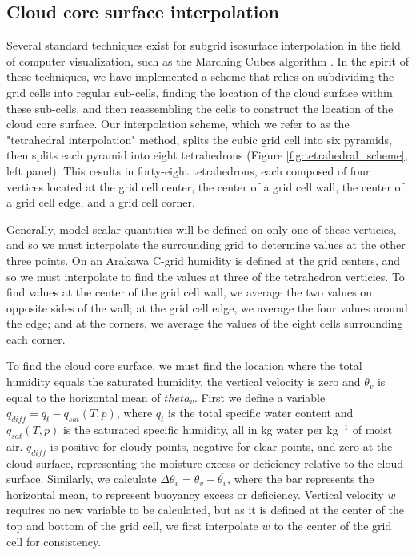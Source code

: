\documentclass[12pt]{article}
\begin{document}

\subsection{Cloud core surface interpolation}

Several standard techniques exist for subgrid isosurface interpolation in the 
field of computer visualization, such as the Marching Cubes algorithm 
\citep{Lorensen1987}.  In the spirit of these techniques, we have implemented 
a scheme that relies on subdividing the grid cells into regular sub-cells, 
finding the location of the cloud surface within these sub-cells, and then 
reassembling the cells to construct the location of the cloud core surface.
Our interpolation scheme, which we refer to as the "tetrahedral interpolation"
method, splits the cubic grid cell into six pyramids, then splits each pyramid 
into eight tetrahedrons (Figure \ref{fig:tetrahedral_scheme}, left 
panel).  This results in forty-eight tetrahedrons, each composed of four 
vertices located at the grid cell center, the center of a grid cell wall, the 
center of a grid cell edge, and a grid cell corner.

Generally, model scalar quantities will be defined on only one of these 
verticies, and so we must interpolate the surrounding grid to determine 
values at the other three points.  On an Arakawa C-grid humidity is defined 
at the grid centers, and so we must interpolate to find the values at three 
of the tetrahedron verticies.  To find values at the center of the grid cell 
wall, we average the two values on opposite sides of the wall; at the grid 
cell edge, we average the four values around the edge; and at the corners, 
we average the values of the eight cells surrounding each corner.

To find the cloud core surface, we must find the location where the total 
humidity equals the saturated humidity, the vertical velocity is zero and 
$\theta_v$ is equal to the horizontal mean of $theta_v$.  First we define a 
variable $q_{diff} = q_t - q_{sat}(T, p)$, where $q_t$ is the total specific 
water content and $q_{sat}(T, p)$ is the saturated specific humidity, all in 
kg water per kg$^{-1}$ of moist air.  $q_{diff}$ is positive for cloudy 
points, negative for clear points, and zero at the cloud surface, representing 
the moisture excess or deficiency relative to the cloud surface.  Similarly, 
we calculate $\Delta \theta_v = \theta_v - \overline{\theta_v}$, where the bar 
represents the horizontal mean, to represent buoyancy excess or deficiency.  
Vertical velocity $w$ requires no new variable to be calculated, but as it is 
defined at the center of the top and bottom of the grid cell, we first 
interpolate $w$ to the center of the grid cell for consistency.
\end{document}
